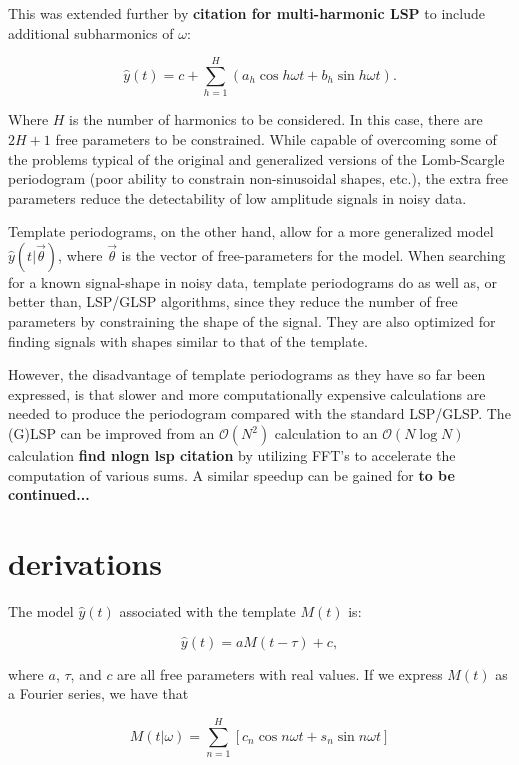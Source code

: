 \documentclass[notitlepage]{article}
\newcommand{\todo}[1]{{\bf #1}}
\newcommand{\Order}[1]{\mathcal{O}\left(#1\right)}
\begin{document}
This was extended further by \todo{citation for multi-harmonic LSP} to include additional subharmonics
of $\omega$:

\begin{equation}
\hat{y}(t) = c + \sum_{h=1}^{H} \left(a_h\cos h\omega t + b_h\sin h\omega t \right).
\end{equation}

Where $H$ is the number of harmonics to be considered. In this case, there are $2H + 1$ free parameters
to be constrained. While capable of overcoming some of the problems 
typical of the original and generalized versions of the Lomb-Scargle
periodogram (poor ability to constrain non-sinusoidal shapes, etc.), the extra free parameters
reduce the detectability of low amplitude signals in noisy data.

Template periodograms, on the other hand, allow for a more generalized model $\hat{y}(t|\vec{\theta})$, where
$\vec{\theta}$ is the vector of free-parameters for the model. When searching for a known signal-shape
in noisy data, template periodograms do as well as, or better than, LSP/GLSP algorithms, since they
reduce the number of free parameters by constraining the shape of the signal. They are also optimized
for finding signals with shapes similar to that of the template.

However, the disadvantage of template periodograms as they have so far been expressed, 
is that slower and more computationally expensive calculations are needed to produce 
the periodogram compared with the standard LSP/GLSP. The (G)LSP can be improved from an 
$\Order{N^2}$ calculation to an $\Order{N\log N}$ calculation \todo{find nlogn lsp citation}
by utilizing FFT's to accelerate the computation of various sums. A similar speedup can be
gained for \todo{to be continued...}


\section{derivations}

The model $\hat{y}(t)$ associated with the template $M(t)$ is:

\begin{equation}
\hat{y}(t) = aM(t - \tau) + c,
\end{equation}

where $a$, $\tau$, and $c$ are all free parameters with real values. If we express $M(t)$ as a Fourier
series, we have that

\begin{equation}
M(t|\omega) = \sum_{n=1}^H \left[c_n\cos n\omega t + s_n\sin n \omega t\right]
\end{equation}
\end{document}
